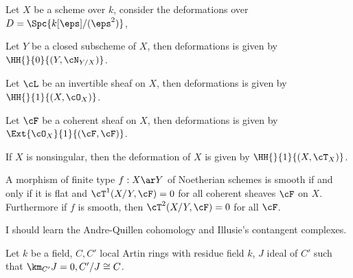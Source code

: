 \documentclass[article, a4paper, twoside]{universal}
\begin{document}
\begin{thm}
	Let $X$ be a scheme over $k$, consider the deformations over $D=\Spc{k[\eps]/(\eps^{2})}$,
	\begin{enr}[label=(\Alph*)]
		\item {\cite[Theorem~2.4]{Hartshorne2010}} Let $Y$ be a closed subscheme of $X$, then deformations is given by $\HH{}{0}{(Y,\cN_{Y/X})}$.
		\item {\cite[Proposition~2.6]{Hartshorne2010}} Let $\cL$ be an invertible sheaf on $X$, then deformations is given by $\HH{}{1}{(X,\cO_{X})}$.
		\item {\cite[Theorem~2.7]{Hartshorne2010}} Let $\cF$ be a coherent sheaf on $X$, then deformations is given by $\Ext{\cO_{X}}{1}{(\cF,\cF)}$.
		\item {\cite[Theorem~5.3]{Hartshorne2010}} If $X$ is nonsingular, then the deformation of $X$ is given by $\HH{}{1}{(X,\cT_{X})}$.
	\end{enr}
\end{thm}

\begin{thm}
	A morphism of finite type $f:X\ar Y$ of Noetherian schemes is smooth if and only if it is flat and $\cT^{1}(X/Y,\cF)=0$ for all coherent sheaves $\cF$ on $X$. Furthermore if $f$ is smooth, then $\cT^{2}(X/Y,\cF)=0$ for all $\cF$.
\end{thm}

\begin{rmk}
	I should learn the Andre-Quillen cohomology and Illusie's contangent complexes.
\end{rmk}

\begin{stp}
	Let $k$ be a field, $C,C'$ local Artin rings with residue field $k$, $J$ ideal of $C'$ such that $\km_{C'}J=0,C'/J\cong C$.
\end{stp}
\end{document}

